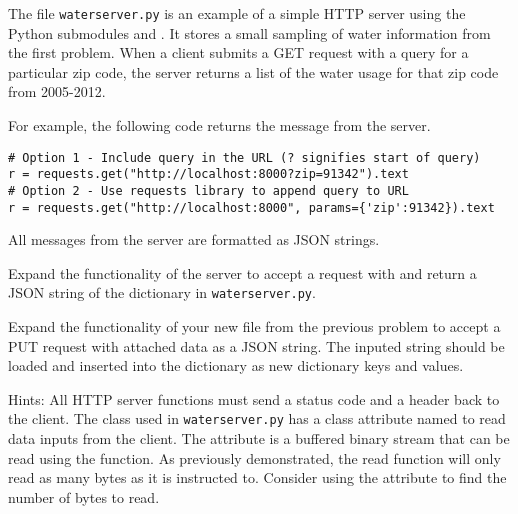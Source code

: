 The file \texttt{waterserver.py} is an example of a simple HTTP server using the Python submodules  and .
It stores a small sampling of water information from the first problem.
When a client submits a GET request with a query for a particular zip code, the server returns a list of the water usage for that zip code from 2005-2012.

For example, the following code returns the message  from the server.

\begin{lstlisting}
# Option 1 - Include query in the URL (? signifies start of query)
r = requests.get("http://localhost:8000?zip=91342").text
# Option 2 - Use requests library to append query to URL
r = requests.get("http://localhost:8000", params={'zip':91342}).text
\end{lstlisting}
All messages from the server are formatted as JSON strings.

Expand the functionality of the server to accept a request with  and return a JSON string of the  dictionary in \texttt{waterserver.py}.

Expand the functionality of your new file from the previous problem to accept a PUT request with attached data as a JSON string.
The inputed string should be loaded and inserted into the  dictionary as new dictionary keys and values.

Hints: All HTTP server functions must send a status code and a header back to the client.
The class used in \texttt{waterserver.py} has a class attribute named  to read data inputs from the client.
The  attribute is a buffered binary stream that can be read using the  function.
As previously demonstrated, the read function will only read as many bytes as it is instructed to.
Consider using the  attribute to find the number of bytes to read.

